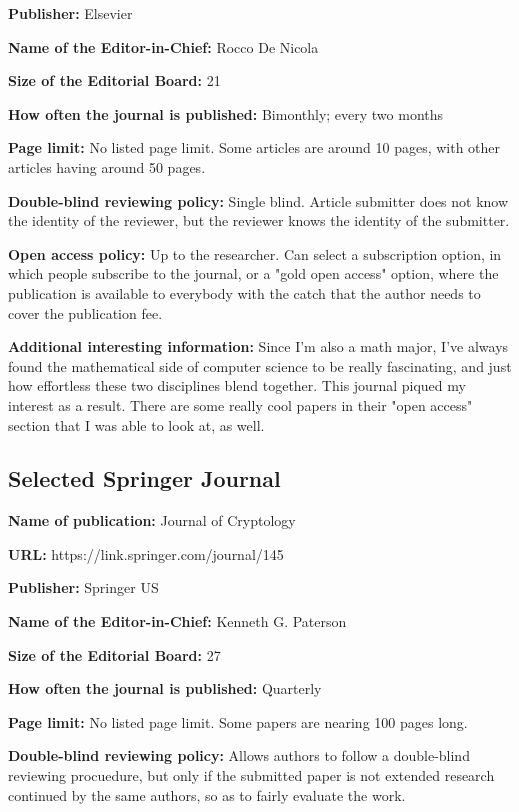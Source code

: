 \documentclass[a4paper,11pt]{article}
\begin{document}
\textbf{Publisher:} Elsevier

\textbf{Name of the Editor-in-Chief:} Rocco De Nicola

\textbf{Size of the Editorial Board:} 21

\textbf{How often the journal is published:} Bimonthly; every two months

\textbf{Page limit:} No listed page limit. Some articles are around 10 pages, with other articles having around 50 pages.

\textbf{Double-blind reviewing policy:} Single blind. Article submitter does not know the identity of the reviewer, but the reviewer knows the identity of the submitter.

\textbf{Open access policy:} Up to the researcher. Can select a subscription option, in which people subscribe to the journal, or a "gold open access" option, where the publication is available to everybody with the catch that the author needs to cover the publication fee.

\textbf{Additional interesting information:} Since I'm also a math major, I've always found the mathematical side of computer science to be really fascinating, and just how effortless these two disciplines blend together. This journal piqued my interest as a result. There are some really cool papers in their "open access" section that I was able to look at, as well.

\subsection*{Selected Springer Journal}

\textbf{Name of publication:} Journal of Cryptology

\textbf{URL:} https://link.springer.com/journal/145

\textbf{Publisher:} Springer US

\textbf{Name of the Editor-in-Chief:} Kenneth G. Paterson

\textbf{Size of the Editorial Board:} 27

\textbf{How often the journal is published:} Quarterly

\textbf{Page limit:} No listed page limit. Some papers are nearing 100 pages long.

\textbf{Double-blind reviewing policy:} Allows authors to follow a double-blind reviewing procuedure, but only if the submitted paper is not extended research continued by the same authors, so as to fairly evaluate the work.
\end{document}
